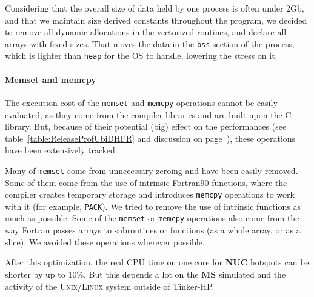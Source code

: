 \documentclass[9pt,comparison]{livecoms}
\newcommand{\lv}{\Large\verb}
\begin{document}
Considering that the overall size of data held by one process is often under 2Gb, and that we maintain size derived constants throughout the program, we decided to remove all dynamic allocations in the vectorized routines, and declare all arrays with fixed sizes. That moves the data in the {\color{codepurple}\lv|bss|} section of the process, which is lighter than  {\color{codepurple}\lv|heap|} for the OS to handle, lowering the stress on it. 

\paragraph{\normalsize Memset and memcpy}
\hspace{\parindent}The execution cost of the {\color{codegreen}\lv|memset|} and {\color{codegreen}\lv|memcpy|} operations cannot be easily evaluated, as they come from the compiler libraries and are built upon the C library. But, because of their potential (big) effect on the performances (see table~\ref{table:ReleaseProfUbiDHFR} and discussion on page~\pageref{Hotspots}), these operations have been extensively tracked. 

Many of {\color{codegreen}\lv|memset|} come from unnecessary zeroing and have been easily removed. Some of them come from the use of intrinsic Fortran90 functions, where the compiler creates temporary storage and introduces {\color{codegreen}\lv|memcpy|} operations to work with it (for example, {\color{blue}\lv|PACK|}). We tried to remove the use of intrinsic functions as much as possible. Some of the {\color{codegreen}\lv|memset|} or {\color{codegreen}\lv|memcpy|} operations also come from the way Fortran passes arrays to subroutines or functions (as a whole array, or as a slice). We avoided these operations wherever possible.

After this optimization, the real CPU time on one core for \textbf{NUC} hotspots can be shorter by up to 10\%. But this depends a lot on the \textbf{MS} simulated and the activity of the \textsc{Unix/Linux} system outside of Tinker-HP.
\end{document}
